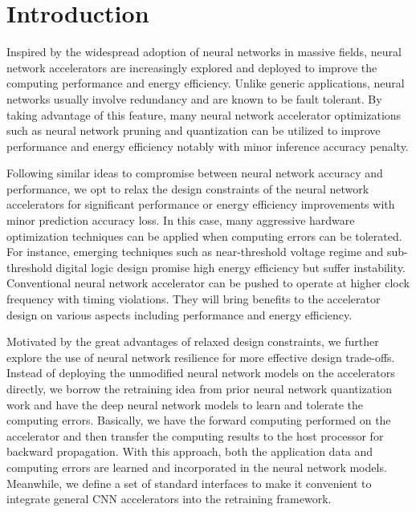 \section{Introduction} \label{sec:intro}
Inspired by the widespread adoption of neural networks in massive fields, neural network accelerators 
\cite{deepburing_12,DiCecco_4} 
are increasingly explored and deployed to improve the computing performance and energy efficiency.
Unlike generic applications, neural networks usually involve redundancy and are known to be 
fault tolerant\cite{Reagen2016}. By taking advantage of this feature, many neural network accelerator optimizations 
such as neural network pruning and quantization can be utilized to improve 
performance and energy efficiency notably with minor inference accuracy penalty\cite{Han2016DeepCC}. 

Following similar ideas to compromise between neural network accuracy and performance, 
we opt to relax the design constraints of the neural network accelerators 
for significant performance or energy efficiency improvements with 
minor prediction accuracy loss. In this case, many aggressive hardware 
optimization techniques can be applied when computing errors can 
be tolerated. For instance, emerging techniques such as
near-threshold voltage regime and sub-threshold digital
logic design\cite{RG2010NT} promise high energy efficiency but suffer
instability\cite{Pu2010NT}. Conventional neural network accelerator can
be pushed to operate at higher clock frequency with timing
violations\cite{overclock_3}. They will bring benefits to the accelerator design 
on various aspects including performance and energy efficiency.

Motivated by the great advantages of relaxed design constraints,
we further explore the use of neural network resilience
for more effective design trade-offs. Instead of deploying the 
unmodified neural network models on the accelerators directly, 
we borrow the retraining idea from prior neural network 
quantization work\cite{Hwang2014_17} and have the deep neural network models to 
learn and tolerate the computing errors.
Basically, we have the forward computing
performed on the accelerator and then transfer the computing
results to the host processor for backward propagation. With
this approach, both the application data and computing errors
are learned and incorporated in the neural network models.
Meanwhile, we define a set of standard interfaces to make
it convenient to integrate general CNN accelerators into the
retraining framework.


